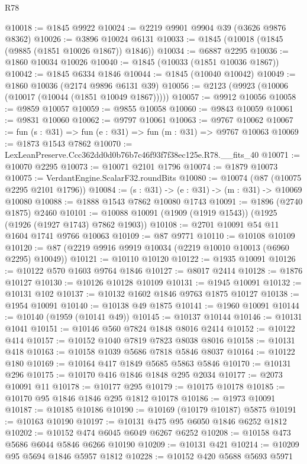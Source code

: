 \begin{lexlean}{R78}
\begin{coremodule}
@10018 := @1845 @9922
@10024 := @2219 @9901 @9904 @39 (@3626 @9876 @8362)
@10026 := @3896 @10024 @6131
@10033 := @1845 (@10018 (@1845 (@9885 (@1851 @10026 @1867)) @1846))
@10034 := @6887 @2295
@10036 := @1860 @10034 @10026
@10040 := @1845 (@10033 (@1851 @10036 @1867))
@10042 := @1845 @6334 @1846
@10044 := @1845 (@10040 @10042)
@10049 := @1860 @10036 (@2174 @9896 @6131 @39)
@10056 := @2123 (@9923 (@10006 (@10017 (@10044 (@1851 @10049 @1867)))))
@10057 := @9912 @10056
@10058 := @9859 @10057
@10059 := @9855 @10058
@10060 := @9843 @10059
@10061 := @9831 @10060
@10062 := @9797 @10061
@10063 := @9767 @10062
@10067 := fun (s : @31) => fun (e : @31) => fun (m : @31) => @9767 @10063
@10069 := @1873 @1543 @7862
@10070 := LexLeanPreserve.Ccc362dd0d0b76b7c46f93f7f38ec125e.R78.__fits_40
@10071 := @10070 @2295
@10073 := @10071 @2101 @1796
@10074 := @1879 @10073
@10075 := VerdantEngine.ScalarF32.roundBits
@10080 := @10074 (@87 (@10075 @2295 @2101 @1796))
@10084 := (s : @31) -> (e : @31) -> (m : @31) -> @10069 @10080
@10088 := @1888 @1543 @7862 @10080 @1743
@10091 := @1896 (@2740 @1875) @2460
@10101 := @10088 @10091 (@1909 (@1919 @1543)) (@1925 (@1926 (@1927 @1743) @7862 @1903))
@10108 := @2701 @10091 @54 @11 @1604 @1741 @9766 @10063
@10109 := @87 @9771
@10110 := @10108 @10109
@10120 := @87 (@2219 @9916 @9919 @10034 (@2219 @10010 @10013 (@6960 @2295) @10049))
@10121 := @10110 @10120
@10122 := @1935 @10091
@10126 := @10122 @570 @1603 @9764 @1846
@10127 := @8017 @2414
@10128 := @1876 @10127
@10130 := @10126 @10128 @10109
@10131 := @1945 @10091
@10132 := @10131 @102
@10137 := @10132 @1602 @1846 @9763 @1875 @10127
@10138 := @1954 @10091
@10140 := @10138 @49 @1875
@10141 := @1960 @10091
@10144 := @10140 (@1959 (@10141 @49))
@10145 := @10137 @10144
@10146 := @10131 @1041
@10151 := @10146 @560 @7824 @1848 @8016 @2414
@10152 := @10122 @414
@10157 := @10152 @1040 @7819 @7823 @8038 @8016
@10158 := @10131 @418
@10163 := @10158 @1039 @5686 @7818 @5846 @8037
@10164 := @10122 @180
@10169 := @10164 @417 @1849 @5685 @5863 @5846
@10170 := @10131 @296
@10175 := @10170 @416 @1846 @1848 @295 @2034
@10177 := @2073 @10091 @11
@10178 := @10177 @295
@10179 := @10175 @10178
@10185 := @10170 @95 @1846 @1846 @295 @1812 @10178
@10186 := @1973 @10091
@10187 := @10185 @10186
@10190 := @10169 (@10179 @10187) @5875
@10191 := @10163 @10190
@10197 := @10131 @475 @95 @6050 @1846 @6252 @1812
@10202 := @10152 @474 @6045 @6049 @6267 @6252
@10208 := @10158 @473 @5686 @6044 @5846 @6266 @10190
@10209 := @10131 @421
@10214 := @10209 @95 @5694 @1846 @5957 @1812
@10228 := @10152
    @420
    @5688
    @5693
    @5971

\end{coremodule}
\end{lexlean}
